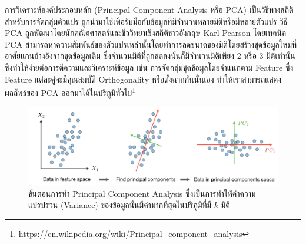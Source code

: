 การวิเคราะห์องค์ประกอบหลัก (Principal Component Analysis หรือ PCA) เป็นวิธีทางสถิติสำหรับการจัดกลุ่มตัวแปร ถูกนำมาใช้เพื่อรับมือกับข้อมูลที่มีจำนวนหลายมิติหรือมีหลายตัวแปร วิธี PCA ถูกพัฒนาโดยนักคณิตศาสตร์และชีววิทยาเชิงสถิติชาวอังกฤษ Karl Pearson โดยเทคนิค PCA สามารถหาความสัมพันธ์ของตัวแปรเหล่านั้นโดยทำการลดขนาดของมิติโดยสร้างชุดข้อมูลใหม่ที่อาศัยแกนอ้างอิงจากชุดข้อมูลเดิม ซึ่งจำนวนมิติที่ถูกลดลงนั้นก็มีจำนวนมิติเพียง 2 หรือ 3 มิติเท่านั้น ซึ่งทำให้ง่ายต่อการตีความและวิเคราะห์ข้อมูล เช่น การจัดกลุ่มชุดข้อมูลโดยจำแนกตาม Feature ซึ่ง Feature แต่ละคู่จะมีคุณสมบัติ Orthogonality หรือตั้งฉากกันนั่นเอง ทำให้เราสามารถแสดงผลลัพธ์ของ PCA ออกมาได้ในปริภูมิทั่วไป\footnote{\url{https://en.wikipedia.org/wiki/Principal_component_analysis}}

\begin{figure}[H]
    \centering
    \includegraphics[width=\linewidth]{fig/pca_process.png}
    \caption{ขั้นตอนการทำ Principal Component Analysis ซึ่งเป็นการทำให้ค่าความแปรปรวน (Variance) ของข้อมูลนั้นมีค่ามากที่สุดในปริภูมิที่มี $k$ มิติ}
    \label{fig:pca_process}
\end{figure}

